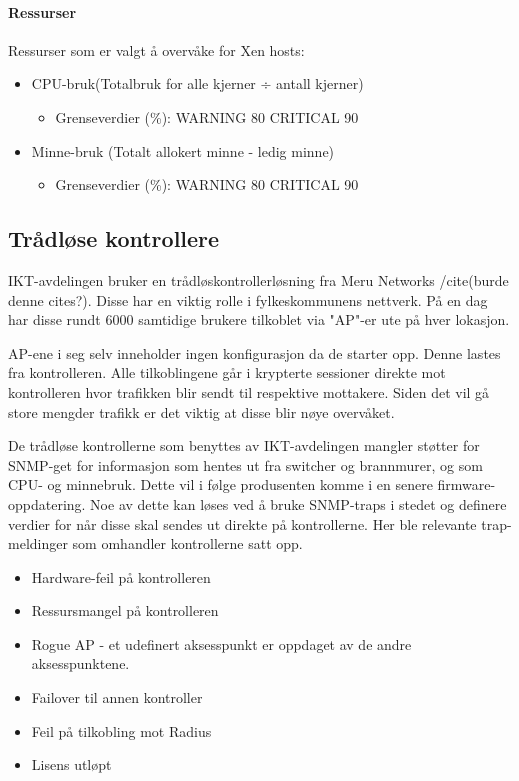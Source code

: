 \paragraph{Ressurser}
Ressurser som er valgt å overvåke for Xen hosts:

\begin{itemize}
        \item CPU-bruk(Totalbruk for alle kjerner ÷ antall kjerner)
        \begin{itemize}
                \item Grenseverdier (\%): WARNING 80 CRITICAL 90
        \end{itemize}
        \item Minne-bruk (Totalt allokert minne - ledig minne)
        \begin{itemize}
                \item Grenseverdier (\%): WARNING 80 CRITICAL 90
        \end{itemize}
\end{itemize}

\subsection{Trådløse kontrollere}
IKT-avdelingen bruker en trådløskontrollerløsning fra Meru Networks /cite(burde denne cites?). Disse har en viktig rolle i fylkeskommunens nettverk. På en dag har disse rundt 6000 samtidige brukere tilkoblet via "AP"-er ute på hver lokasjon.

AP-ene i seg selv inneholder ingen konfigurasjon da de starter opp. Denne lastes fra kontrolleren. Alle tilkoblingene går i krypterte sessioner direkte mot kontrolleren hvor trafikken blir sendt til respektive mottakere. Siden det vil gå store mengder trafikk er det viktig at disse blir nøye overvåket.

De trådløse kontrollerne som benyttes av IKT-avdelingen mangler støtter for SNMP-get for informasjon som hentes ut fra switcher og brannmurer, og som CPU- og minnebruk. Dette vil i følge produsenten komme i en senere firmware-oppdatering. Noe av dette kan løses ved å bruke SNMP-traps i stedet og definere verdier for når disse skal sendes ut direkte på kontrollerne. Her ble relevante trap-meldinger som omhandler kontrollerne satt opp.

\begin{itemize}
	\item Hardware-feil på kontrolleren
	\item Ressursmangel på kontrolleren
	\item Rogue AP - et udefinert aksesspunkt er oppdaget av de andre aksesspunktene.
	\item Failover til annen kontroller
	\item Feil på tilkobling mot Radius
	\item Lisens utløpt
\end{itemize}

